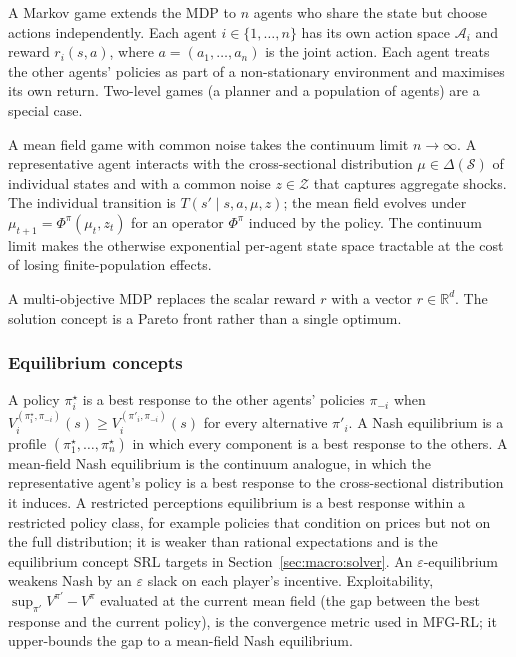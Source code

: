 A Markov game extends the MDP to $n$ agents who share the state but
choose actions independently. Each agent $i \in \{1, \ldots, n\}$ has
its own action space $\mathcal A_i$ and reward $r_i(s, a)$, where
$a = (a_1, \ldots, a_n)$ is the joint action. Each agent treats the
other agents' policies as part of a non-stationary environment and
maximises its own return. Two-level games (a planner and a population
of agents) are a special case.

A mean field game with common noise takes the continuum limit
$n \to \infty$. A representative agent interacts with the
cross-sectional distribution $\mu \in \Delta(\mathcal S)$ of
individual states and with a common noise $z \in \mathcal Z$ that
captures aggregate shocks. The individual transition is
$T(s' \mid s, a, \mu, z)$; the mean field evolves under
$\mu_{t+1} = \Phi^\pi(\mu_t, z_t)$ for an operator $\Phi^\pi$ induced
by the policy. The continuum limit makes the otherwise exponential
per-agent state space tractable at the cost of losing finite-population
effects.

A multi-objective MDP replaces the scalar reward $r$ with a vector
$r \in \mathbb R^d$. The solution concept is a Pareto front rather
than a single optimum.

\subsubsection{Equilibrium concepts}

A policy $\pi^\star_i$ is a best response to the other agents'
policies $\pi_{-i}$ when $V_i^{(\pi^\star_i, \pi_{-i})}(s) \ge
V_i^{(\pi'_i, \pi_{-i})}(s)$ for every alternative $\pi'_i$. A Nash
equilibrium is a profile $(\pi^\star_1, \ldots, \pi^\star_n)$ in which
every component is a best response to the others. A mean-field Nash
equilibrium is the continuum analogue, in which the representative
agent's policy is a best response to the cross-sectional distribution
it induces. A restricted perceptions equilibrium is a best response
within a restricted policy class, for example policies that condition
on prices but not on the full distribution; it is weaker than
rational expectations and is the equilibrium concept SRL targets in
Section~\ref{sec:macro:solver}. An
$\varepsilon$-equilibrium weakens Nash by an $\varepsilon$ slack on
each player's incentive. Exploitability, $\sup_{\pi'} V^{\pi'} -
V^\pi$ evaluated at the current mean field (the gap between the best
response and the current policy), is the convergence metric used in
MFG-RL; it upper-bounds the gap to a mean-field Nash equilibrium.

